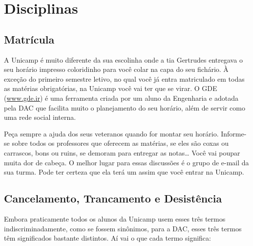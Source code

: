 \section{Disciplinas}

\subsection{Matrícula}

A Unicamp é muito diferente da sua
escolinha onde a tia Gertrudes entregava o seu horário impresso coloridinho para
você colar na capa do seu fichário. À exceção do primeiro semestre letivo, no qual
você já entra matriculado em todas as matérias obrigatórias, na Unicamp você vai ter que se virar.
O GDE (\url{www.gde.ir}) é uma ferramenta criada por um aluno da Engenharia e adotada
pela DAC que facilita muito o planejamento do seu horário, além de servir como uma
rede social interna.

Peça sempre a ajuda dos seus veteranos quando for montar seu horário. Informe-se
sobre todos os professores que oferecem as matérias, se eles são coxas ou carrascos,
bons ou ruins, se demoram para entregar as notas{\dots} Você vai poupar muita dor
de cabeça. O melhor lugar para essas discussões é o grupo de e-mail da sua turma.
Pode ter certeza que ela terá um assim que você entrar na Unicamp.

\subsection{Cancelamento, Trancamento e Desistência}

Embora praticamente todos os alunos da Unicamp usem esses três termos
indiscriminadamente, como se fossem sinônimos, para a DAC, esses três termos
têm significados bastante distintos. Aí vai o que cada termo significa:

